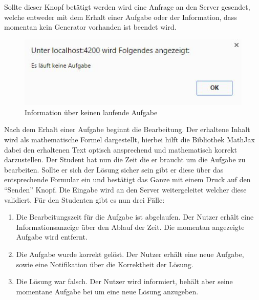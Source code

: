 Sollte dieser Knopf betätigt werden wird eine Anfrage an den Server gesendet, welche entweder mit dem Erhalt einer Aufgabe oder der Information, dass momentan kein Generator vorhanden ist beendet wird. \\

\begin{figure}[htp]     %
\centering
\includegraphics[width=1\textwidth]{bilder/NoTaskRunning} 
\caption[Information über keine laufende Aufgabe]{Information über keinen laufende Aufgabe}
\end{figure} 

Nach dem Erhalt einer Aufgabe beginnt die Bearbeitung. Der erhaltene Inhalt wird als mathematische Formel dargestellt, hierbei hilft die Bibliothek MathJax dabei den erhaltenen Text optisch ansprechend und mathematisch korrekt darzustellen. Der Student hat nun die Zeit die er braucht um die Aufgabe zu bearbeiten. Sollte er sich der Lösung sicher sein gibt er diese über das entsprechende Formular ein und bestätigt das Ganze mit einem Druck auf den ``Senden'' Knopf. Die Eingabe wird an den Server weitergeleitet welcher diese validiert. Für den Studenten gibt es nun drei Fälle: \\
\begin{enumerate}
\item Die Bearbeitungszeit für die Aufgabe ist abgelaufen. Der Nutzer erhält eine Informationsanzeige über den Ablauf der Zeit. Die momentan angezeigte Aufgabe wird entfernt.
\item Die Aufgabe wurde korrekt gelöst. Der Nutzer erhält eine neue Aufgabe, sowie eine Notifikation über die Korrektheit der Lösung.
\item Die Lösung war falsch. Der Nutzer wird informiert, behält aber seine momentane Aufgabe bei um eine neue Lösung anzugeben.
\end{enumerate} 

